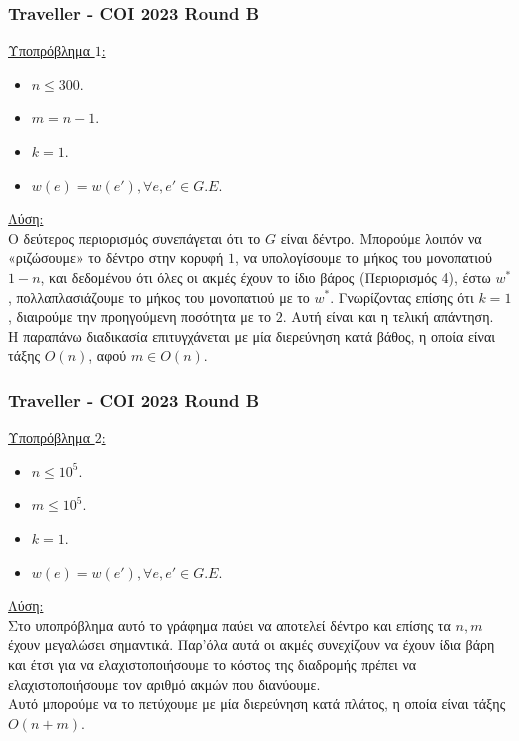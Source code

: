 \documentclass[t]{beamer}
\begin{document}
\begin{frame}
	\frametitle{Traveller  - COI 2023 Round B}
	\underline{Υποπρόβλημα $1$:}
	\pause
	\vspace{0.25cm} 
	\begin{itemize}
		\item $n \leq 300$.
		\pause
		\item $m = n - 1$.
		\pause
		\item $k = 1$.
		\pause
		\item $w(e) = w(e'), \forall e, e' \in G.E$. 
	\end{itemize}
	\pause
	\vspace{0.25cm} 
	\underline{Λύση:}
	\pause
	\\
	\vspace{0.25cm} 
	Ο δεύτερος περιορισμός συνεπάγεται ότι το $G$ είναι δέντρο. Μπορούμε λοιπόν να
	«ριζώσουμε» το δέντρο στην κορυφή $1$, να υπολογίσουμε το μήκος του μονοπατιού $1 - n$, και δεδομένου ότι όλες οι ακμές έχουν το ίδιο βάρος (Περιορισμός 4), έστω $w^*$, πολλαπλασιάζουμε 
	το μήκος του μονοπατιού με το $w^*$. Γνωρίζοντας επίσης ότι $k = 1$, διαιρούμε την προηγούμενη ποσότητα με το $2$. Αυτή είναι και η τελική απάντηση.
	\pause
	\\
	\vspace{0.25cm} 
	Η παραπάνω διαδικασία επιτυγχάνεται με μία διερεύνηση κατά βάθος, η οποία είναι τάξης $O(n)$, αφού $m \in O(n)$.
\end{frame}

\begin{frame}
	\frametitle{Traveller  - COI 2023 Round B}
	\underline{Υποπρόβλημα $2$:}
	\pause
	\vspace{0.25cm} 
	\begin{itemize}
		\item $n \leq 10^5$.
		\pause
		\item $m \leq 10^5$.
		\pause
		\item $k = 1$.
		\pause
		\item $w(e) = w(e'), \forall e, e' \in G.E$. 
	\end{itemize}
	\pause
	\vspace{0.25cm} 
	\underline{Λύση:}
	\pause
	\\
	\vspace{0.25cm} 
	Στο υποπρόβλημα αυτό το γράφημα παύει να αποτελεί δέντρο και επίσης τα $n, m$ έχουν μεγαλώσει σημαντικά. Παρ'όλα αυτά οι ακμές συνεχίζουν να έχουν ίδια βάρη και έτσι για να ελαχιστοποιήσουμε 
	το κόστος της διαδρομής πρέπει να ελαχιστοποιήσουμε τον αριθμό ακμών που διανύουμε. 
	\pause
	\\
	\vspace{0.25cm} 
	Αυτό μπορούμε να το πετύχουμε με μία διερεύνηση κατά πλάτος, η οποία είναι τάξης $O(n + m)$. 
\end{frame}
\end{document}
